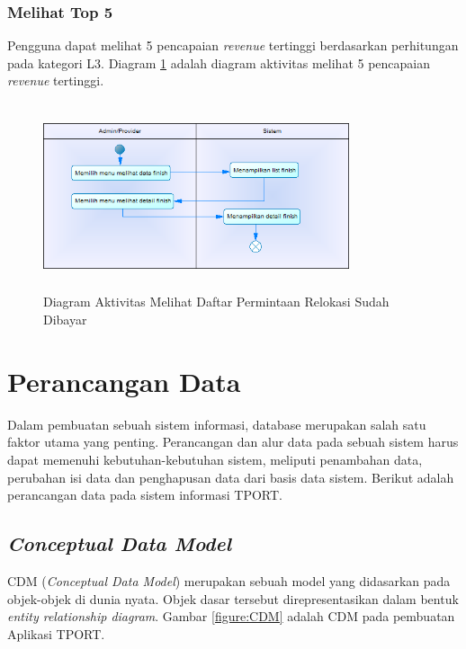 \subsubsection{Melihat Top 5}
Pengguna dapat melihat 5 pencapaian \textit{revenue} tertinggi berdasarkan perhitungan pada kategori L3. Diagram \ref{figure:activity_melihat_finish} adalah diagram aktivitas melihat 5 pencapaian \textit{revenue} tertinggi.

\begin{figure}[h]
	\centerline {\includegraphics[width=9cm,height=5.5cm]{bab4/ActivityDiagram_MelihatFinish.png}}
	\caption{Diagram Aktivitas Melihat Daftar Permintaan Relokasi Sudah Dibayar}
	\label{figure:activity_melihat_finish}
\end{figure}
	
\newpage
\section{Perancangan Data}
\tab Dalam pembuatan sebuah sistem informasi, database merupakan salah satu faktor utama yang penting. Perancangan dan alur data pada sebuah sistem harus dapat memenuhi kebutuhan-kebutuhan sistem, meliputi penambahan data, perubahan isi data dan penghapusan data dari basis data sistem. Berikut adalah perancangan data pada sistem informasi TPORT.

\subsection{\textit{Conceptual Data Model}}
CDM (\textit{Conceptual Data Model}) merupakan sebuah model yang didasarkan pada objek-objek di dunia nyata. Objek dasar tersebut direpresentasikan dalam bentuk \textit{entity relationship diagram}. Gambar \ref{figure:CDM} adalah CDM pada pembuatan Aplikasi TPORT.

